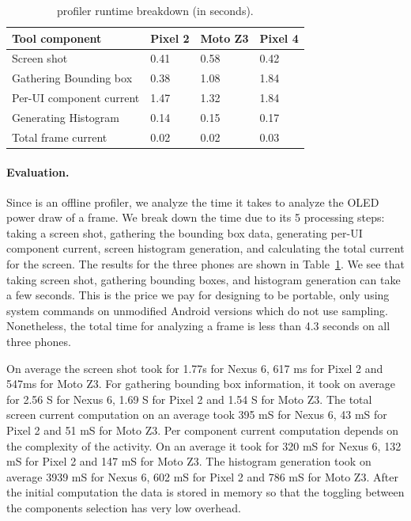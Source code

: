 \begin{table}[tp]
\begin{center}
	\centering
	\caption{\name profiler runtime breakdown (in seconds).}
	\label{tab:tooloverhead}
        \vspace{-0.1in}
    {\footnotesize
                \begin{tabular*}{\columnwidth}{ | p{} | p{} | p{} | p{} | }
		\hline
		Tool component        	&  Pixel 2 & Moto Z3 & Pixel 4\\
		\hline
		Screen shot	        	&  0.41 & 0.58 & 0.42 \\
		Gathering Bounding box  &  0.38 & 1.08 & 1.84 \\
		Per-UI component current	&  1.47 & 1.32 & 1.84 \\
		Generating Histogram	&  0.14 & 0.15 & 0.17 \\  
		Total frame current     &  0.02 & 0.02 & 0.03 \\
		\hline
	\end{tabular*}
	}
\end{center}
\vspace{-0.15in}
\end{table}

\paragraph{Evaluation.}
Since \name is an offline profiler,
we analyze the time it takes to analyze the OLED power draw of a frame.
We break down the time due
to its 5 processing steps: taking a screen shot, gathering the bounding box
data, generating per-UI component current, screen histogram generation,
and calculating the total current for the screen.  The results for the
three phones are shown in Table~\ref{tab:tooloverhead}.  We see that
taking screen shot, gathering bounding boxes, and histogram generation can
take a few seconds. This is the price we pay
for designing \name to be portable, \ie  only using system
commands on unmodified Android versions which do not use sampling.
Nonetheless, the total time for analyzing a frame is less than 4.3
seconds on all three phones.



On average the screen shot took for 1.77s for Nexus 6, 617
ms for Pixel 2 and 547ms for Moto Z3.  For gathering bounding box
information, it took on average for 2.56 S for Nexus 6, 1.69 S for
Pixel 2 and 1.54 S for Moto Z3.  The total screen current computation
on an average took 395 mS for Nexus 6, 43 mS for Pixel 2 and 51 mS for
Moto Z3.  Per component current computation depends on the complexity
of the activity. On an average it took for 320 mS for Nexus 6, 132 mS
for Pixel 2 and 147 mS for Moto Z3.  The histogram generation took on
average 3939 mS for Nexus 6, 602 mS for Pixel 2 and 786 mS for Moto
Z3.  After the initial computation the data is stored in memory so
that the toggling between the components selection has very low
overhead.
\fi

